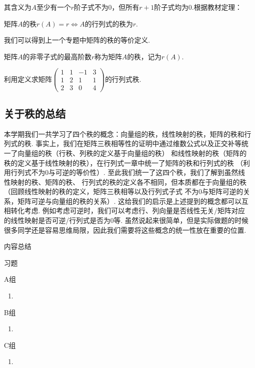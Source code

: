 \raggedright 其含义为$A$至少有一个$r$阶子式不为0，但所有$r+1$阶子式均为0.根据教材定理：
\begin{theorem}
    矩阵$A$的秩$r(A)=r \iff A$的行列式的秩为$r$.
\end{theorem}
\raggedright 我们可以得到上一个专题中矩阵的秩的等价定义.
\begin{definition}
    矩阵$A$的非零子式的最高阶数$r$称为矩阵$A$的秩，记为$r(A)$.
\end{definition}
\begin{example}
    利用定义求矩阵$\begin{pmatrix}
        1 & 1 & -1 & 3 \\ 1 & 2 & 1 & 1 \\ 2 & 3 & 0 & 4
    \end{pmatrix}$的行列式秩.
\end{example}
\subsection{关于秩的总结}
本学期我们一共学习了四个秩的概念：向量组的秩，线性映射的秩，矩阵的秩和行列式的秩.
事实上，我们在矩阵三秩相等性的证明中通过维数公式以及正交补等统一了向量组的秩（行秩、列秩的定义基于向量组的秩）
和线性映射的秩（矩阵的秩的定义基于线性映射的秩），在行列式一章中统一了矩阵的秩和行列式的秩
（利用行列式不为0与可逆的等价性）. 至此我们统一了这四个秩，我们了解到虽然线性映射的秩、矩阵的秩、
行列式的秩的定义各不相同，但本质都在于向量组的秩（回顾线性映射的秩的定义，矩阵三秩相等以及行列式子式
不为0与矩阵可逆的关系，矩阵可逆与向量组的秩的关系）. 这给我们的启示是上述提到的概念都可以互相转化考虑.
例如考虑可逆时，我们可以考虑行、列向量是否线性无关/矩阵对应的线性映射是否可逆/行列式是否为0等.
虽然说起来很简单，但是实际做题的时候很多同学还是容易思维局限，因此我们需要将这些概念的统一性放在重要的位置.

\vspace{2ex}
\centerline{\heiti \Large 内容总结}

\vspace{2ex}

\centerline{\heiti \Large 习题}
\vspace{2ex}
{\kaishu }
\begin{flushright}
    \kaishu

\end{flushright}
\centerline{\heiti A组}
\begin{enumerate}
    \item
\end{enumerate}
\centerline{\heiti B组}
\begin{enumerate}
    \item
\end{enumerate}
\centerline{\heiti C组}
\begin{enumerate}
    \item
\end{enumerate}
